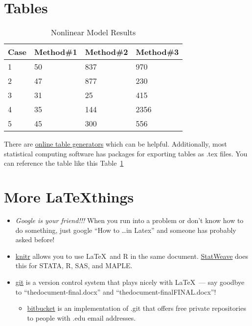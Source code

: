 \documentclass[12pt]{article} %
\begin{document}
\section{Tables}

\begin{table}[hb]
  \caption{Nonlinear Model Results}
  \centering
  \begin{tabular}{@{}llll@{}}
    \toprule  
    Case & Method\#1 & Method\#2 & Method\#3\\[0.5ex]%
\midrule
    1 & 50 & 837 & 970\\
    2 & 47 & 877 & 230\\
    3 & 31 & 25  & 415\\
    4 & 35 & 144 & 2356\\
    5 & 45 & 300 & 556\\
\bottomrule 
  \end{tabular}\label{table:nonlin} %
\end{table}



There are \href{e.g.  http://www.tablesgenerator.com/}{online table generators} which can be helpful.  Additionally, most statistical computing software has packages for exporting tables as .tex files. You can reference the table like this Table~\ref{table:nonlin}

\section{More \LaTeX things}
\begin{itemize}
\item \emph{Google is your friend!!!} When you run into a problem or
  don't know how to do something, just google ``How to \ldots in
  Latex'' and someone has probably asked before!
\item \href{http://yihui.name/knitr/}{knitr} allows you to use
  \LaTeX~and  R in the same document. \href{http://homepage.stat.uiowa.edu/~rlenth/StatWeave/StatWeave-manual.pdf}{StatWeave} does this for STATA, R, SAS, and MAPLE. 
\item \href{https://git-scm.com/}{git} is a version control system
  that plays nicely with \LaTeX~--- say goodbye to
 ``thedocument-final.docx''  and ``thedocument-finalFINAL.docx''! 
\begin{itemize}
\item \href{https://bitbucket.org/}{bitbucket} is an implementation of .git that offers free private repositories to people with .edu email addresses. 
\end{itemize}
\
\end{itemize}
\end{document}
